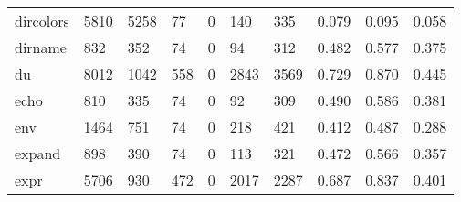 \begin{longtable}{lp{1.3cm}p{1.3cm}p{1.3cm}p{1.3cm}p{1.3cm}p{1.3cm}p{1.3cm}p{1.3cm}p{1.3cm}}
dircolors &                   5810 &                               5258 &                                77 &                                0 &                               140 &                             335 &                                   0.079 &                                  0.095 &                                0.058 \\
dirname   &                    832 &                                352 &                                74 &                                0 &                                94 &                             312 &                                   0.482 &                                  0.577 &                                0.375 \\
du        &                   8012 &                               1042 &                               558 &                                0 &                              2843 &                            3569 &                                   0.729 &                                  0.870 &                                0.445 \\
echo      &                    810 &                                335 &                                74 &                                0 &                                92 &                             309 &                                   0.490 &                                  0.586 &                                0.381 \\
env       &                   1464 &                                751 &                                74 &                                0 &                               218 &                             421 &                                   0.412 &                                  0.487 &                                0.288 \\
expand    &                    898 &                                390 &                                74 &                                0 &                               113 &                             321 &                                   0.472 &                                  0.566 &                                0.357 \\
expr      &                   5706 &                                930 &                               472 &                                0 &                              2017 &                            2287 &                                   0.687 &                                  0.837 &                                0.401 \\

\end{longtable}
